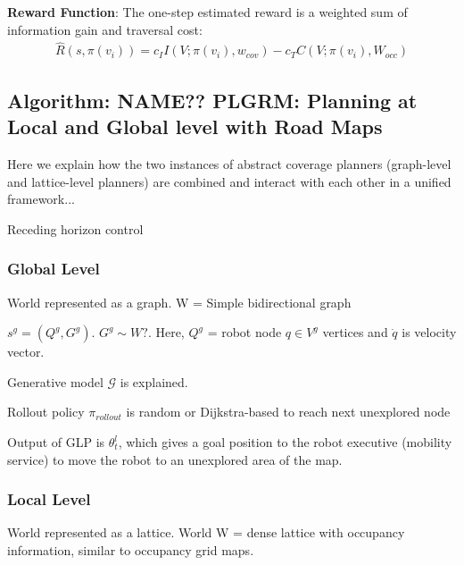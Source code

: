 \documentclass{article}
\newcommand{\ph}[1]{{\textbf{#1}:}} %
\begin{document}





\ph{Reward Function} The one-step estimated reward is a weighted sum of information gain and traversal cost:
\begin{align}
    \hat{R}(s, \pi(v_i)) = c_{I} I(V; \pi(v_i), w_{cov}) - c_{T}  C(V; \pi(v_i), W_{occ})
    \label{eq:lattice_reward}
\end{align}


\subsection{Algorithm: NAME?? PLGRM: Planning at Local and Global level with Road Maps}

Here we explain how the two instances of abstract coverage planners (graph-level and lattice-level planners) are combined and interact with each other in a unified framework...

Receding horizon control



\subsubsection{Global Level}
World represented as a graph. W = Simple bidirectional graph

$s^g = (Q^g, G^g)$. $G^g \sim W?$. Here, $Q^g$ = robot node $q \in V^g$ vertices  and $\dot{q}$ is velocity vector.

Generative model $\mathcal{G}$ is explained.

Rollout policy $\pi_{rollout}$ is random or Dijkstra-based to reach next unexplored node

Output of GLP is $\theta^l_t$, which gives a goal position to the robot executive (mobility service) to move the robot to an unexplored area of the map.

\subsubsection{Local Level}
World represented as a lattice. World W = dense lattice with occupancy information, similar to occupancy grid maps.
\end{document}
